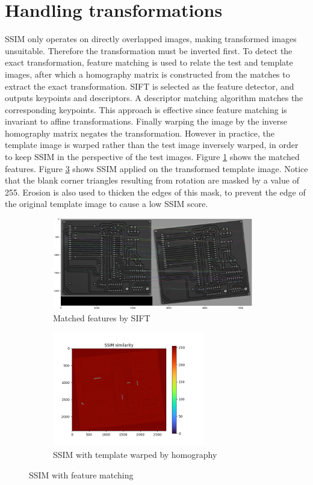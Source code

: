 \documentclass{report}
\begin{document}
\section{Handling transformations}

SSIM only operates on directly overlapped images, making transformed images unsuitable. Therefore the transformation must be inverted first. To detect the exact transformation, feature matching is used to relate the test and template images, after which a homography matrix is constructed from the matches to extract the exact transformation. SIFT is selected as the feature detector, and outputs keypoints and descriptors. A descriptor matching algorithm matches the corresponding keypoints. This approach is effective since feature matching is invariant to affine transformations.
Finally warping the image by the inverse homography matrix negates the transformation. However in practice, the template image is warped rather than the test image inversely warped, in order to keep SSIM in the perspective of the test images. Figure \ref{fig:match} shows the matched features. Figure \ref{fig:homo_ssim} shows SSIM applied on the transformed template image. Notice that the blank corner triangles resulting from rotation are masked by a value of 255. Erosion is also used to thicken the edges of this mask, to prevent the edge of the original template image to cause a low SSIM score.

\begin{figure}[H]
    \centering
    \begin{subfigure}[b]{0.45\linewidth}
        \centering
        \includegraphics[height=40mm, keepaspectratio]{report_images/plots/match.png}
        \caption{Matched features by SIFT}
        \label{fig:match}
    \end{subfigure}
    \hfill
    \begin{subfigure}[b]{0.45\linewidth}
        \centering
        \includegraphics[height=50mm, keepaspectratio]{report_images/plots/homo_ssim.png}
        \caption{SSIM with template warped by homography}
        \label{fig:homo_ssim}
    \end{subfigure}
    \caption{SSIM with feature matching}
\end{figure}
\end{document}
